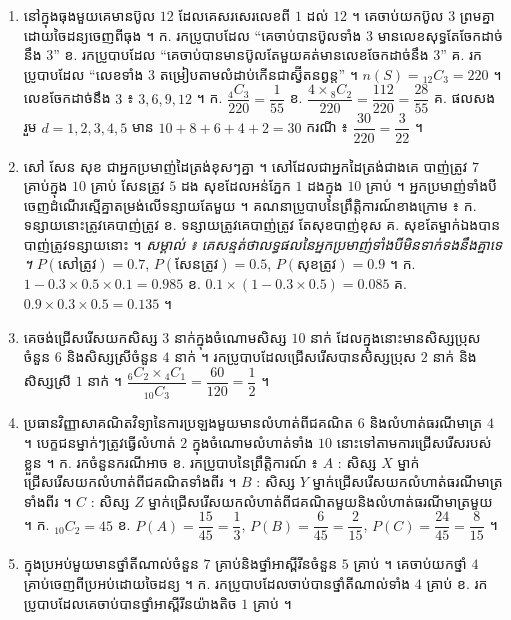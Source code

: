 \begin{enumerate}[1]
  \item នៅក្នុងធុងមួយគេមានប៊ូល $12$ ដែលគេសរសេរលេខពី $1$ ដល់ $12$ ។ គេចាប់យកប៊ូល $3$ ព្រមគ្នាដោយចៃដន្យចេញពីធុង ។ \quad ក. រកប្រូបាបដែល “គេចាប់បានប៊ូលទាំង $3$ មានលេខសុទ្ធតែចែកដាច់នឹង $3$” \quad ខ. រកប្រូបាបដែល “គេចាប់បានមានប៊ូលតែមួយគត់មានលេខចែកដាច់នឹង $3$” \quad គ. រកប្រូបាបដែល “លេខទាំង $3$ តម្រៀបតាមលំដាប់កើនជាស្វ៊ីតនព្វន្ត” ។
  \ans
  $n(S) = {}_{12}C_3 = 220$ ។ លេខចែកដាច់នឹង $3$ ៖ $3, 6, 9, 12$ ។ ក. $\dfrac{{}_4C_3}{220} = \dfrac{1}{55}$ \quad ខ. $\dfrac{4\times{}_8C_2}{220} = \dfrac{112}{220} = \dfrac{28}{55}$ \quad គ. ផលសងរួម $d = 1, 2, 3, 4, 5$ មាន $10 + 8 + 6 + 4 + 2 = 30$ ករណី ៖ $\dfrac{30}{220} = \dfrac{3}{22}$ ។
  \item សៅ សែន សុខ ជាអ្នកប្រមាញ់ដៃត្រង់ខុសៗគ្នា ។ សៅដែលជាអ្នកដៃត្រង់ជាងគេ បាញ់ត្រូវ $7$ គ្រាប់ក្នុង $10$ គ្រាប់ សែនត្រូវ $5$ ដង សុខដែលអន់ភ្នែក $1$ ដងក្នុង $10$ គ្រាប់ ។ អ្នកប្រមាញ់ទាំងបីចេញដំណើរស្មើគ្នាតម្រង់លើទន្សាយតែមួយ ។ គណនាប្រូបាបនៃព្រឹត្តិការណ៍ខាងក្រោម ៖ \quad ក. ទន្សាយនោះត្រូវគេបាញ់ត្រូវ \quad ខ. ទន្សាយត្រូវគេបាញ់ត្រូវ តែសុខបាញ់ខុស \quad គ. សុខតែម្នាក់ឯងបានបាញ់ត្រូវទន្សាយនោះ ។ \quad \textit{សម្គាល់ ៖ គេសន្មត់ថាលទ្ធផលនៃអ្នកប្រមាញ់ទាំងបីមិនទាក់ទងនឹងគ្នាទេ ។}
  \ans
  $P(\text{សៅត្រូវ}) = 0.7$, $P(\text{សែនត្រូវ}) = 0.5$, $P(\text{សុខត្រូវ}) = 0.9$ ។ ក. $1 - 0.3\times 0.5\times 0.1 = 0.985$ \quad ខ. $0.1\times(1 - 0.3\times 0.5) = 0.085$ \quad គ. $0.9\times 0.3\times 0.5 = 0.135$ ។
  \item គេចង់ជ្រើសរើសយកសិស្ស $3$ នាក់ក្នុងចំណោមសិស្ស $10$ នាក់ ដែលក្នុងនោះមានសិស្សប្រុសចំនួន $6$ និងសិស្សស្រីចំនួន $4$ នាក់ ។ រកប្រូបាបដែលជ្រើសរើសបានសិស្សប្រុស $2$ នាក់ និងសិស្សស្រី $1$ នាក់ ។
  \ans
  $\dfrac{{}_6C_2\times{}_4C_1}{{}_{10}C_3} = \dfrac{60}{120} = \dfrac{1}{2}$ ។
  \item ប្រធានវិញ្ញាសាគណិតវិទ្យានៃការប្រឡងមួយមានលំហាត់ពីជគណិត $6$ និងលំហាត់ធរណីមាត្រ $4$ ។ បេក្ខជនម្នាក់ៗត្រូវធ្វើលំហាត់ $2$ ក្នុងចំណោមលំហាត់ទាំង $10$ នោះទៅតាមការជ្រើសរើសរបស់ខ្លួន ។ \quad ក. រកចំនួនករណីអាច \quad ខ. រកប្រូបាបនៃព្រឹត្តិការណ៍ ៖ $A$ : សិស្ស $X$ ម្នាក់ជ្រើសរើសយកលំហាត់ពីជគណិតទាំងពីរ ។ $B$ : សិស្ស $Y$ ម្នាក់ជ្រើសរើសយកលំហាត់ធរណីមាត្រទាំងពីរ ។ $C$ : សិស្ស $Z$ ម្នាក់ជ្រើសរើសយកលំហាត់ពីជគណិតមួយនិងលំហាត់ធរណីមាត្រមួយ ។
  \ans
  ក. ${}_{10}C_2 = 45$ \quad ខ. $P(A) = \dfrac{15}{45} = \dfrac{1}{3}$, $P(B) = \dfrac{6}{45} = \dfrac{2}{15}$, $P(C) = \dfrac{24}{45} = \dfrac{8}{15}$ ។
  \item ក្នុងប្រអប់មួយមានថ្នាំតីណាល់ចំនួន $7$ គ្រាប់និងថ្នាំអាស្ពីរីនចំនួន $5$ គ្រាប់ ។ គេចាប់យកថ្នាំ $4$ គ្រាប់ចេញពីប្រអប់ដោយចៃដន្យ ។ \quad ក. រកប្រូបាបដែលចាប់បានថ្នាំតីណាល់ទាំង $4$ គ្រាប់ \quad ខ. រកប្រូបាបដែលគេចាប់បានថ្នាំអាស្ពីរីនយ៉ាងតិច $1$ គ្រាប់ ។

\end{enumerate}
